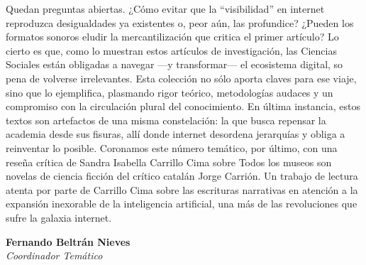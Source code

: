 \documentclass[
  letterpaper,
  DIV=11,
  numbers=noendperiod]{scrartcl}
\begin{document}
Quedan preguntas abiertas. ¿Cómo evitar que la ``visibilidad'' en
internet reproduzca desigualdades ya existentes o, peor aún, las
profundice? ¿Pueden los formatos sonoros eludir la mercantilización que
critica el primer artículo? Lo cierto es que, como lo muestran estos
artículos de investigación, las Ciencias Sociales están obligadas a
navegar ---y transformar--- el ecosistema digital, so pena de volverse
irrelevantes. Esta colección no sólo aporta claves para ese viaje, sino
que lo ejemplifica, plasmando rigor teórico, metodologías audaces y un
compromiso con la circulación plural del conocimiento. En última
instancia, estos textos son artefactos de una misma constelación: la que
busca repensar la academia desde sus fisuras, allí donde internet
desordena jerarquías y obliga a reinventar lo posible. Coronamos este
número temático, por último, con una reseña crítica de Sandra Isabella
Carrillo Cima sobre Todos los museos son novelas de ciencia ficción del
crítico catalán Jorge Carrión. Un trabajo de lectura atenta por parte de
Carrillo Cima sobre las escrituras narrativas en atención a la expansión
inexorable de la inteligencia artificial, una más de las revoluciones
que sufre la galaxia internet.

\begin{flushright}
\textbf{Fernando Beltrán Nieves}\\

\textit{Coordinador Temático}
\end{flushright}
\end{document}
